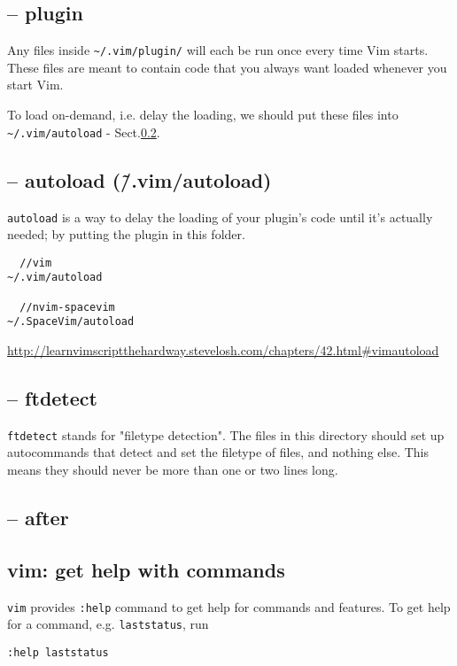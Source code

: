 \subsection{-- plugin}

Any files inside \verb!~/.vim/plugin/! will each be run once every time Vim
starts. These files are meant to contain code that you always want loaded
whenever you start Vim.

To load on-demand, i.e. delay the loading, we should put these files into
\verb!~/.vim/autoload! - Sect.\ref{sec:vim-autoload}.

\subsection{-- autoload (\~/.vim/autoload)}
\label{sec:vim-autoload}

\verb!autoload! is a way to delay the loading of your plugin's code until it's
actually needed; by putting the plugin in this folder.
\begin{verbatim}
  //vim
~/.vim/autoload

  //nvim-spacevim
~/.SpaceVim/autoload
\end{verbatim} 
\url{http://learnvimscriptthehardway.stevelosh.com/chapters/42.html#vimautoload}


\subsection{-- ftdetect}
\label{sec:vim-ftdetect}
  
  \verb!ftdetect! stands for "filetype detection". The files in this directory
  should set up autocommands that detect and set the filetype of files, and
  nothing else. This means they should never be more than one or two lines long.  



\subsection{-- after}
\label{sec:vim-after}


\subsection{vim: get help with commands}
\label{sec:vim-help}

\verb!vim! provides \verb!:help! command to get help for commands and features.
To get help for a command, e.g. \verb!laststatus!, run
\begin{verbatim}
:help laststatus
\end{verbatim}

